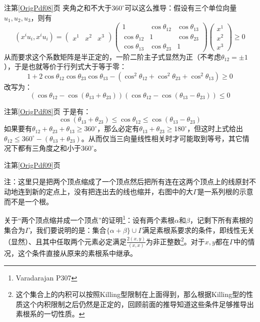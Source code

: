 \documentclass{beamer}
\newcommand{\pdfpage}[1]{{\usebackgroundtemplate{\texttt{[image: W6/W6\_页面\_\#1.jpg]}}\begin{frame}[plain]\label{OrigPdf#1}\end{frame}}}%
\newcommand{\refpage}[1]{注第\ref{OrigPdf#1}页}%
\begin{document}
\begin{frame}{\refpage{08}}
	夹角之和不大于$360^\circ$可以这么推导：假设有三个单位向量$u_1,u_2,u_3$，则有
	\begin{equation*}
	(x^iu_i,x^iu_i)=\begin{pmatrix} x^1 & x^2 & x^3 \end{pmatrix}
	\begin{pmatrix}
	1 & \cos\theta_{12} & \cos\theta_{13} \\
	\cos\theta_{12} & 1 & \cos\theta_{23} \\
	\cos\theta_{13} & \cos\theta_{23} & 1
	\end{pmatrix}
	\begin{pmatrix}x^1 \\ x^2 \\ x^3\end{pmatrix}\geq 0
	\end{equation*}
	从而要求这个系数矩阵是半正定的，一阶二阶主子式显然为正（不考虑$\theta_{12}=\pm 1$），于是也就等价于行列式大于等于零：
	\begin{equation*}
	1+2\cos\theta_{12}\cos\theta_{23}\cos\theta_{13}-\left(\cos^2\theta_{12}+\cos^2\theta_{23}+\cos^2\theta_{13}\right)\geq 0
	\end{equation*}
	改写为：
	\begin{equation*}
	\left(\cos\theta_{12}-\cos(\theta_{13}+\theta_{23})\right)\left(\cos\theta_{12}-\cos(\theta_{13}-\theta_{23})\right)\leq 0
	\end{equation*}
\end{frame}

\begin{frame}{\refpage{08}}
	于是有：
	\begin{equation*}
	\cos(\theta_{13}+\theta_{23})\leq\cos\theta_{12}\leq\cos(\theta_{13}-\theta_{23})
	\end{equation*}
	如果要有$\theta_{12}+\theta_{23}+\theta_{13}\geq 360^\circ$，那么必定有$\theta_{13}+\theta_{23}\geq 180^\circ$，但这时上式给出$\theta_{12}\leq 360^\circ-(\theta_{13}+\theta_{23})$。从而仅当三向量线性相关时才可能取到等号，其它情况下都有三角度之和小于$360^\circ$。
\end{frame}

\pdfpage{09}

\begin{frame}{\refpage{09}}
	
	注：这里只是把两个顶点缩成了一个顶点然后把所有连在这两个顶点上的线原封不动地连到新的定点上，没有把连出去的线也缩并，右图中的大$\Gamma$是一系列根的示意而不是一个根。
	
	关于“两个顶点缩并成一个顶点”的证明\footnote{Varadarajan P307}：设有两个素根$\alpha$和$\beta$，记剩下所有素根的集合为$\Gamma$，我们要说明的是：集合$\{\alpha+\beta\}\cup\Gamma$满足素根系要求的条件，即线性无关（显然）、且其中任取两个元素必定满足$\frac{2(x,y)}{(x,x)}$为非正整数\footnote{这个集合上的内积可以按照Killing型限制在上面得到，那么根据Killing型的性质这个内积限制之后仍然是正定的，回顾前面的推导知道这些条件足够推导出素根系的一切性质。}。对于$x,y$都在$\Gamma$中的情况，这个条件直接从原来的素根系中继承。
	
\end{frame}
\end{document}
